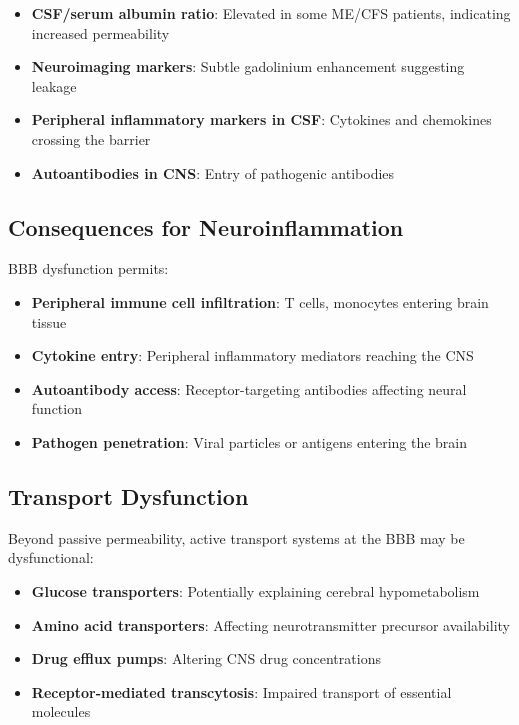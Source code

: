 \begin{itemize}
    \item \textbf{CSF/serum albumin ratio}: Elevated in some ME/CFS patients, indicating increased permeability
    \item \textbf{Neuroimaging markers}: Subtle gadolinium enhancement suggesting leakage
    \item \textbf{Peripheral inflammatory markers in CSF}: Cytokines and chemokines crossing the barrier
    \item \textbf{Autoantibodies in CNS}: Entry of pathogenic antibodies
\end{itemize}

\subsection{Consequences for Neuroinflammation}

BBB dysfunction permits:

\begin{itemize}
    \item \textbf{Peripheral immune cell infiltration}: T cells, monocytes entering brain tissue
    \item \textbf{Cytokine entry}: Peripheral inflammatory mediators reaching the CNS
    \item \textbf{Autoantibody access}: Receptor-targeting antibodies affecting neural function
    \item \textbf{Pathogen penetration}: Viral particles or antigens entering the brain
\end{itemize}

\subsection{Transport Dysfunction}

Beyond passive permeability, active transport systems at the BBB may be dysfunctional:

\begin{itemize}
    \item \textbf{Glucose transporters}: Potentially explaining cerebral hypometabolism
    \item \textbf{Amino acid transporters}: Affecting neurotransmitter precursor availability
    \item \textbf{Drug efflux pumps}: Altering CNS drug concentrations
    \item \textbf{Receptor-mediated transcytosis}: Impaired transport of essential molecules
\end{itemize}


